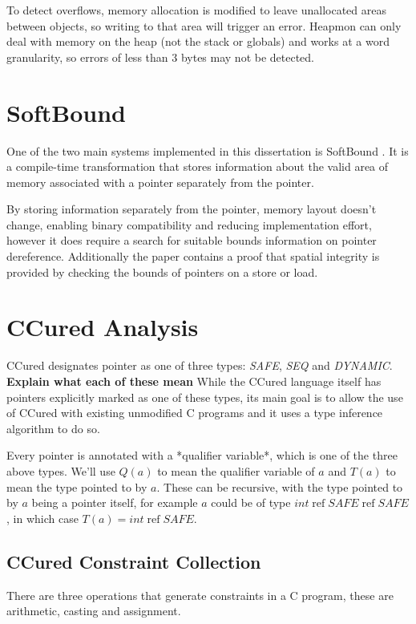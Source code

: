 To detect overflows, memory allocation is modified to leave unallocated areas between objects, so writing to that area will trigger an error.
Heapmon can only deal with memory on the heap (not the stack or globals) and works at a word granularity, so errors of less than 3 bytes may not be detected.

\section{SoftBound}

One of the two main systems implemented in this dissertation is SoftBound \cite{nagarakatte2009softbound}.
It is a compile-time transformation that stores information about the valid area of memory associated with a pointer separately from the pointer.

By storing information separately from the pointer, memory layout doesn't change, enabling binary compatibility and reducing implementation effort, however it does require a search for suitable bounds information on pointer dereference.
Additionally the paper contains a proof that spatial integrity is provided by checking the bounds of pointers on a store or load.

\section{CCured Analysis}

CCured designates pointer as one of three types: \textit{SAFE}, \textit{SEQ} and \textit{DYNAMIC}.
\textbf{Explain what each of these mean}
While the CCured language itself has pointers explicitly marked as one of these types, its main goal is to allow the use of CCured with existing unmodified C programs and it uses a type inference algorithm to do so.

Every pointer is annotated with a *qualifier variable*, which is one of the three above types.
We'll use $Q(a)$ to mean the qualifier variable of $a$ and $T(a)$ to mean the type pointed to by $a$.
These can be recursive, with the type pointed to by $a$ being a pointer itself, for example $a$ could be of type $int\; \mbox{ref}\; SAFE\; \mbox{ref}\; SAFE$, in which case $T(a) = int\;\mbox{ref}\;SAFE$.

\subsection{CCured Constraint Collection}

There are three operations that generate constraints in a C program, these are arithmetic, casting and assignment.

